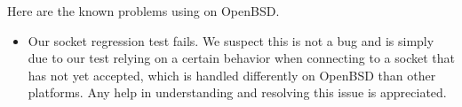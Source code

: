 
Here are the known problems using {\mlton} on OpenBSD.

\begin{itemize}

\item Our socket regression test fails.  We suspect this is not a bug
and is simply due to our test relying on a certain behavior when
connecting to a socket that has not yet accepted, which is handled
differently on OpenBSD than other platforms.  Any help in
understanding and resolving this issue is appreciated.

\end{itemize}
